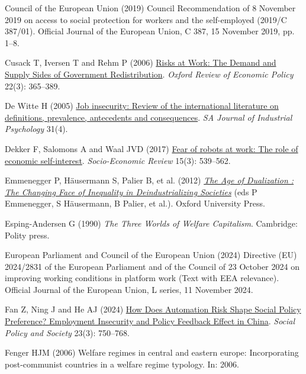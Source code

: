 \documentclass[
  12pt,
]{article}
\newlength{\cslhangindent}
\newenvironment{CSLReferences}[2] %
 {\begin{list}{}{%
  \setlength{\itemindent}{0pt}
  \setlength{\leftmargin}{0pt}
  \setlength{\parsep}{0pt}
  \ifodd #1
   \setlength{\leftmargin}{\cslhangindent}
   \setlength{\itemindent}{-1\cslhangindent}
  \fi
  \setlength{\itemsep}{#2\baselineskip}}}
 {\end{list}}
\begin{document}
\begin{CSLReferences}{1}{1}
Council of the European Union (2019) Council {Recommendation} of 8
{November} 2019 on access to social protection for workers and the
self-employed (2019/{C} 387/01). Official Journal of the European Union,
C 387, 15 November 2019, pp. 1--8.

Cusack T, Iversen T and Rehm P (2006)
\href{https://doi.org/10.1093/oxrep/grj022}{Risks at {Work}: {The
Demand} and {Supply Sides} of {Government Redistribution}}. \emph{Oxford
Review of Economic Policy} 22(3): 365--389.

De Witte H (2005) \href{https://doi.org/10.4102/sajip.v31i4.200}{Job
insecurity: {Review} of the international literature on definitions,
prevalence, antecedents and consequences}. \emph{SA Journal of
Industrial Psychology} 31(4).

Dekker F, Salomons A and Waal JVD (2017)
\href{https://doi.org/10.1093/ser/mwx005}{Fear of robots at work: The
role of economic self-interest}. \emph{Socio-Economic Review} 15(3):
539--562.

Emmenegger P, Häusermann S, Palier B, et al. (2012)
\emph{\href{https://doi.org/10.5167/UZH-65793}{The Age of Dualization :
The Changing Face of Inequality in Deindustrializing Societies}} (eds P
Emmenegger, S Häusermann, B Palier, et al.). Oxford University Press.

Esping-Andersen G (1990) \emph{The Three Worlds of Welfare Capitalism}.
Cambridge: Polity press.

European Parliament and Council of the European Union (2024) Directive
({EU}) 2024/2831 of the {European Parliament} and of the {Council} of 23
{October} 2024 on improving working conditions in platform work ({Text}
with {EEA} relevance). Official Journal of the European Union, L series,
11 November 2024.

Fan Z, Ning J and He AJ (2024)
\href{https://doi.org/10.1017/S1474746422000513}{How {Does Automation
Risk Shape Social Policy Preference}? {Employment Insecurity} and
{Policy Feedback Effect} in {China}}. \emph{Social Policy and Society}
23(3): 750--768.

Fenger HJM (2006) Welfare regimes in central and eastern europe:
{Incorporating} post-communist countries in a welfare regime typology.
In: 2006.


\end{CSLReferences}
\end{document}
